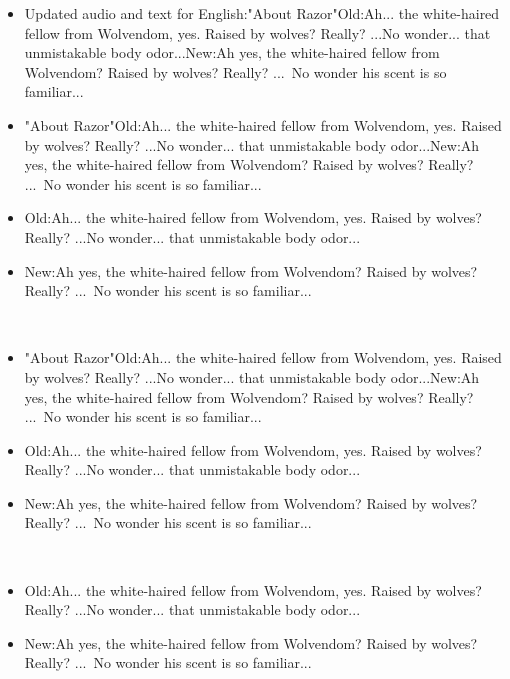 \documentclass[a4paper,12pt]{article}
\begin{document}
\begin{itemize}
\item Updated audio and text for English:"About Razor"Old:Ah... the white-haired fellow from Wolvendom, yes. Raised by wolves? Really? ...No wonder... that unmistakable body odor...New:Ah yes, the white-haired fellow from Wolvendom? Raised by wolves? Really? ... No wonder his scent is so familiar...
\item "About Razor"Old:Ah... the white-haired fellow from Wolvendom, yes. Raised by wolves? Really? ...No wonder... that unmistakable body odor...New:Ah yes, the white-haired fellow from Wolvendom? Raised by wolves? Really? ... No wonder his scent is so familiar...
\item Old:Ah... the white-haired fellow from Wolvendom, yes. Raised by wolves? Really? ...No wonder... that unmistakable body odor...
\item New:Ah yes, the white-haired fellow from Wolvendom? Raised by wolves? Really? ... No wonder his scent is so familiar...
\end{itemize}\\ \par \vspace{0.5cm}

\begin{itemize}
\item "About Razor"Old:Ah... the white-haired fellow from Wolvendom, yes. Raised by wolves? Really? ...No wonder... that unmistakable body odor...New:Ah yes, the white-haired fellow from Wolvendom? Raised by wolves? Really? ... No wonder his scent is so familiar...
\item Old:Ah... the white-haired fellow from Wolvendom, yes. Raised by wolves? Really? ...No wonder... that unmistakable body odor...
\item New:Ah yes, the white-haired fellow from Wolvendom? Raised by wolves? Really? ... No wonder his scent is so familiar...
\end{itemize}\\ \par \vspace{0.5cm}

\begin{itemize}
\item Old:Ah... the white-haired fellow from Wolvendom, yes. Raised by wolves? Really? ...No wonder... that unmistakable body odor...
\item New:Ah yes, the white-haired fellow from Wolvendom? Raised by wolves? Really? ... No wonder his scent is so familiar...
\end{itemize}\\ \par \vspace{0.5cm}
\end{document}

